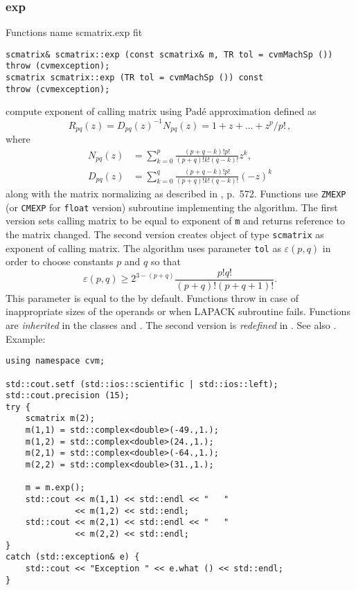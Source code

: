 \subsubsection{exp}
Functions%
\pdfdest name {scmatrix.exp} fit
\begin{verbatim}
scmatrix& scmatrix::exp (const scmatrix& m, TR tol = cvmMachSp ())
throw (cvmexception);
scmatrix scmatrix::exp (TR tol = cvmMachSp ()) const
throw (cvmexception);
\end{verbatim}
compute  exponent of  calling matrix using Pad\'e approximation
defined as
\begin{equation*}
R_{pq}(z)=D_{pq}(z)^{-1}N_{pq}(z)=1+z+\dots+z^p/p!\,,
\end{equation*}
where
\begin{align*}
N_{pq}(z)&=\sum_{k=0}^p\frac{(p+q-k)!p!}{(p+q)!k!(q-k)!}z^k,\\
D_{pq}(z)&=\sum_{k=0}^q\frac{(p+q-k)!p!}{(p+q)!k!(q-k)!}(-z)^k
\end{align*}
along with the matrix normalizing as described in
, p.~572.
Functions use \verb"ZMEXP" (or \verb"CMEXP" for \verb"float" version)
\FORTRAN subroutine implementing the algorithm.
The first version sets calling matrix to be equal to
 exponent of \verb"m" and returns  reference to the matrix
changed. The second version
creates  object of type \verb"scmatrix" as 
exponent of  calling matrix.
The algorithm uses parameter \verb"tol"
as $\varepsilon(p,q)$ in order to choose constants $p$ and $q$
so that
\begin{equation*}
\varepsilon(p,q)\ge 2^{3-(p+q)}\frac{p!q!}{(p+q)!(p+q+1)!}.
\end{equation*}
This parameter is equal to the
 by default.
Functions throw   
in case of
inappropriate sizes of the operands or when LAPACK subroutine fails.
Functions are \emph{inherited} in the classes
and . The second version
is \emph{redefined} in .
See also
.
Example:
\begin{Verbatim}
using namespace cvm;

std::cout.setf (std::ios::scientific | std::ios::left); 
std::cout.precision (15);
try {
    scmatrix m(2);
    m(1,1) = std::complex<double>(-49.,1.);
    m(1,2) = std::complex<double>(24.,1.);
    m(2,1) = std::complex<double>(-64.,1.);
    m(2,2) = std::complex<double>(31.,1.);

    m = m.exp();
    std::cout << m(1,1) << std::endl << "   " 
              << m(1,2) << std::endl;
    std::cout << m(2,1) << std::endl << "   " 
              << m(2,2) << std::endl;
}
catch (std::exception& e) {
    std::cout << "Exception " << e.what () << std::endl;
}
\end{Verbatim}
